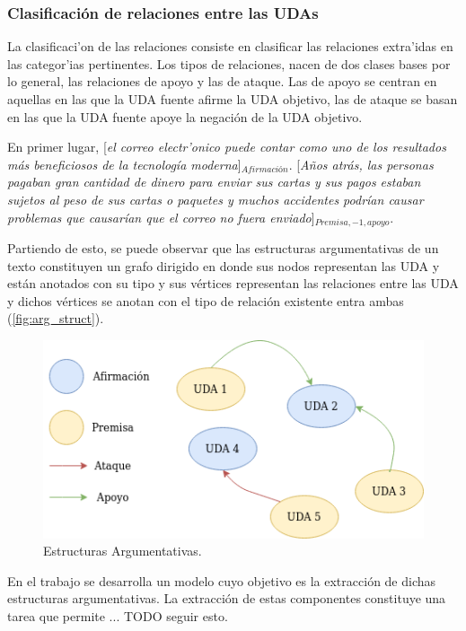 \subsubsection{Clasificación de relaciones entre las UDAs}

La clasificaci'on de las relaciones consiste en clasificar las relaciones extra'idas en las categor'ias pertinentes.
Los tipos de relaciones, nacen de dos clases bases por lo general, las relaciones de apoyo y las de ataque.
Las de apoyo se centran en aquellas en las que la UDA fuente afirme la UDA objetivo, las de ataque se basan en 
las que la UDA fuente apoye la negación de la UDA objetivo.

\begin{adjustwidth}{25pt}{25pt}
    En primer lugar, [\emph{el correo electr'onico puede contar como uno de los resultados
    más beneficiosos de la tecnología moderna}]$_{Afirmación}$. [\emph{Años atrás, las personas pagaban gran cantidad de dinero para 
    enviar sus cartas y sus pagos estaban sujetos al peso de sus cartas o paquetes y muchos accidentes podrían 
    causar problemas que causarían que el correo no fuera enviado}]$_{Premisa, -1, apoyo}$.
\end{adjustwidth}

Partiendo de esto, se puede observar que las estructuras argumentativas de un texto constituyen un grafo dirigido 
en donde sus nodos representan las UDA y están anotados con su tipo y sus vértices representan las 
relaciones entre las UDA y dichos vértices se anotan con el tipo de relación existente entra ambas (\ref{fig:arg_struct}).

\begin{figure}[h!]
	\begin{center}
		\begin{center}
			\includegraphics[scale=.7]{Graphics/Estructuras_argumentativas.png}
        \end{center}
	    \caption{Estructuras Argumentativas.}
	\end{center}
\end{figure}\label{fig:arg_struct}


En el trabajo se desarrolla un modelo cuyo objetivo es la extracción de dichas estructuras argumentativas. 
La extracción de estas componentes constituye una tarea que permite ... TODO seguir esto.
